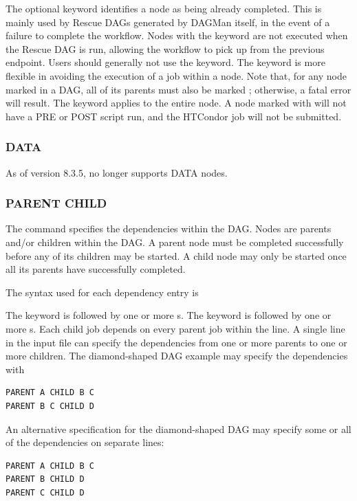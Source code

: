 The optional  keyword identifies a node as being already
completed.
This is mainly used by Rescue DAGs generated by DAGMan itself,
in the event of a failure to complete the workflow.
Nodes with the  keyword are not executed when the Rescue DAG is run,
allowing the workflow to pick up from the previous endpoint.  Users
should generally not use the  keyword.
The  keyword is more flexible in avoiding
the execution of a job within a node.
Note that, for any node marked  in a DAG, all of
its parents must also be marked ; 
otherwise, a fatal error will result.
The  keyword applies to the entire node.
A node marked with  will not have a PRE or POST script run,
and the HTCondor job will not be submitted.

\subsubsection{\label{sec:dagman_data_command}DATA}
\label{dagman:DATA}

As of version 8.3.5,  no longer supports DATA nodes.

\subsubsection{\label{sec:dagman_parent_child_command}PARENT \Dots CHILD}
\label{dagman:ParentChild}

The   command specifies the
dependencies within the DAG.
Nodes are parents and/or children within the DAG.
A parent node must be completed successfully before
any of its children may be started.
A child node may only be started once
all its parents have successfully completed.

The syntax used for each dependency entry is

   

The  keyword is followed by one or more
s.
The  keyword is followed by one or more
s.
Each child job depends on every parent job within the line.
A single line in the input file can specify the dependencies from one or more
parents to one or more children.
The diamond-shaped DAG example may specify the dependencies with
\begin{verbatim}
PARENT A CHILD B C
PARENT B C CHILD D
\end{verbatim}
An alternative specification for the diamond-shaped DAG
may specify some or all of the dependencies on separate lines:
\begin{verbatim}
PARENT A CHILD B C
PARENT B CHILD D
PARENT C CHILD D
\end{verbatim}

